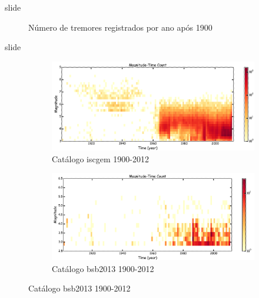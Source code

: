 \documentclass[ucs,8pt]{beamer}
\begin{document}
\begin{frame}{slide}
\begin{figure}[H]
\begin{subfigure}[t]{0.50\textheight}
			\label{fig:br_decluster}
    \end{subfigure}%
	\caption{Número de tremores registrados por ano após 1900}
	\label{fig:eq_decluster}
\end{figure}

\end{frame}



\begin{frame}{slide}

\begin{figure}[H]
	  \centering
	  \begin{subfigure}[b]{0.7\textheight}
		  	\centering
			\includegraphics[height=1.00\textheight]{time_mag_count_sa}
			\caption{Catálogo \gls{iscgem} 1900-2012}
			\label{fig:tmf_sa}
        \end{subfigure}%

	  \begin{subfigure}[b]{0.7\textheight}
		  	\centering
  			\includegraphics[height=1.00\textheight]{time_mag_count_br}
			\caption{Catálogo \gls{bsb2013} 1900-2012}
			\label{fig:tmf_br}
       \end{subfigure}%


\end{figure}
\end{frame}
\end{document}
